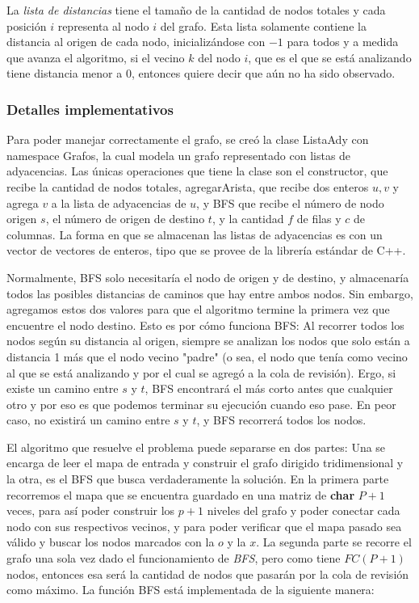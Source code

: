         La \textit{lista de distancias} tiene el tamaño de la cantidad de nodos totales y cada posición $i$ representa al nodo $i$ del grafo. Esta lista solamente contiene la distancia al origen de cada nodo, inicializándose con $-1$ para todos y a medida que avanza el algoritmo, si el vecino $k$ del nodo $i$, que es el que se está analizando tiene distancia menor a $0$, entonces quiere decir que aún no ha sido observado.


        \subsubsection{Detalles implementativos}
            Para poder manejar correctamente el grafo, se creó la clase ListaAdy con namespace Grafos, la cual modela un grafo representado con listas de adyacencias. Las únicas operaciones que tiene la clase son el constructor, que recibe la cantidad de nodos totales, agregarArista, que recibe dos enteros $u,v$ y agrega $v$ a la lista de adyacencias de $u$, y BFS que recibe el número de nodo origen $s$, el número de origen de destino $t$, y la cantidad $f$ de filas y $c$ de columnas.
            La forma en que se almacenan las listas de adyacencias es con un vector de vectores de enteros, tipo que se provee de la librería estándar de C++.

            Normalmente, BFS solo necesitaría el nodo de origen y de destino, y almacenaría todos las posibles distancias de caminos que hay entre ambos nodos. Sin embargo, agregamos estos dos valores para que el algoritmo termine la primera vez que encuentre el nodo destino. Esto es por cómo funciona BFS: Al recorrer todos los nodos según su distancia al origen, siempre se analizan los nodos que solo están a distancia 1 más que el nodo vecino "padre" (o sea, el nodo que tenía como vecino al que se está analizando y por el cual se agregó a la cola de revisión). Ergo, si existe un camino entre $s$ y $t$, BFS encontrará el más corto antes que cualquier otro y por eso es que podemos terminar su ejecución cuando eso pase. En peor caso, no existirá un camino entre $s$ y $t$, y BFS recorrerá todos los nodos.

            El algoritmo que resuelve el problema puede separarse en dos partes: Una se encarga de leer el mapa de entrada y construir el grafo dirigido tridimensional y la otra, es el BFS que busca verdaderamente la solución.
            En la primera parte recorremos el mapa que se encuentra guardado en una matriz de \textbf{char} $P+1$ veces, para así poder construir los $p+1$ niveles del grafo y poder conectar cada nodo con sus respectivos vecinos, y para poder verificar que el mapa pasado sea válido y buscar los nodos marcados con la $o$ y la $x$.
            La segunda parte se recorre el grafo una sola vez dado el funcionamiento de \textit{BFS}, pero como tiene $FC(P+1)$ nodos, entonces esa será la cantidad de nodos que pasarán por la cola de revisión como máximo. La función BFS está implementada de la siguiente manera:



